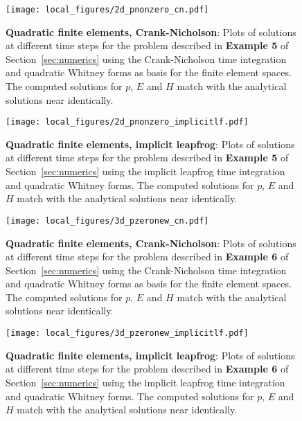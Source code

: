 \documentclass{amsart}
\theoremstyle{thmstyleone}%
\theoremstyle{thmstyletwo}%
\theoremstyle{thmstylethree}%
\begin{document}
\vspace{\fill}
\begin{figure}[h]
  \centering
  \texttt{[image: local\_figures/2d\_pnonzero\_cn.pdf]}
  \caption{\textbf{Quadratic finite elements, Crank-Nicholson}: Plots of solutions at different time steps for the problem described in \textbf{Example 5} of Section~\ref{sec:numerics} using the Crank-Nicholson time integration and quadratic Whitney forms as basis for the finite element spaces. The computed solutions for $p$, $E$ and $H$ match with the analytical solutions near identically.}
  \label{fig:example5_cn}
\end{figure}
\vspace{\fill}
\clearpage

\vspace{\fill}
\begin{figure}[h]
  \centering
  \texttt{[image: local\_figures/2d\_pnonzero\_implicitlf.pdf]}
  \caption{\textbf{Quadratic finite elements, implicit leapfrog}: Plots of solutions at different time steps for the problem described in \textbf{Example 5} of Section~\ref{sec:numerics} using the implicit leapfrog time integration and quadratic Whitney forms. The computed solutions for $p$, $E$ and $H$ match with the analytical solutions near identically.}
  \label{fig:example5_lf}
\end{figure}
\vspace{\fill}
\clearpage

\vspace{\fill}
\begin{figure}[h]
  \centering
  \texttt{[image: local\_figures/3d\_pzeronew\_cn.pdf]}
  \caption{\textbf{Quadratic finite elements, Crank-Nicholson}: Plots of solutions at different time steps for the problem described in \textbf{Example 6} of Section~\ref{sec:numerics} using the Crank-Nicholson time integration and quadratic Whitney forms as basis for the finite element spaces. The computed solutions for $p$, $E$ and $H$ match with the analytical solutions near identically.}
  \label{fig:example6_cn}
\end{figure}
\vspace{\fill}
\clearpage

\vspace{\fill}
\begin{figure}[h]
  \centering
  \texttt{[image: local\_figures/3d\_pzeronew\_implicitlf.pdf]}
  \caption{\textbf{Quadratic finite elements, implicit leapfrog}: Plots of solutions at different time steps for the problem described in \textbf{Example 6} of Section~\ref{sec:numerics} using the implicit leapfrog time integration and quadratic Whitney forms. The computed solutions for $p$, $E$ and $H$ match with the analytical solutions near identically.}
  \label{fig:example6_lf}
\end{figure}
\vspace{\fill}
\clearpage
\end{document}
